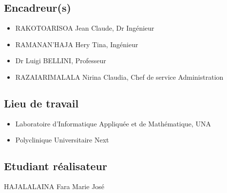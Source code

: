\documentclass[11pt]{article}
\begin{document}
			
	
	
		\subsection*{Encadreur(s)}
			\begin{itemize}
				\item	RAKOTOARISOA Jean Claude, Dr Ingénieur
				\item	RAMANAN'HAJA Hery Tina, Ingénieur
				\item	Dr Luigi BELLINI, Professeur
				\item	RAZAIARIMALALA Nirina Claudia, Chef de service Administration
			\end{itemize}
		
		\subsection{Lieu de travail}
		\begin{itemize}
			\item	Laboratoire d'Informatique Appliquée et de Mathématique, UNA
			\item	Polyclinique Universitaire Next
		\end{itemize}
		\subsection{Etudiant réalisateur}
		 HAJALALAINA Fara Marie José
		 
	
\end{document}
